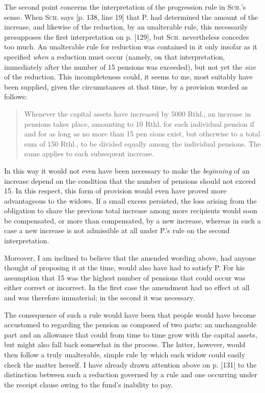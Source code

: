 The second point concerns the interpretation of the progression rule in \textsc{Sch.}'s sense. When \textsc{Sch.} says [p. 138, line 19] that P. had determined the amount of the increase, and likewise of the reduction, by an unalterable rule, this necessarily presupposes the first interpretation on p. [129], but \textsc{Sch.} nevertheless concedes too much. An unalterable rule for reduction was contained in it only insofar as it specified \textit{when} a reduction must occur (namely, on that interpretation, immediately after the number of 15 pensions was exceeded), but not yet the \textit{size} of the reduction. This incompleteness could, it seems to me, most suitably have been supplied, given the circumstances at that time, by a provision worded as follows:
\begin{quote}
Whenever the capital assets have increased by 5000 Rthl., an increase in pensions takes place, amounting to 10 Rthl. for each individual pension if and for as long as no more than 15 pen%
sions exist, but otherwise to a total sum of 150 Rthl., to be divided equally among the individual pensions. The same applies to each subsequent increase.
\end{quote}
\noindent In this way it would not even have been necessary to make the \textit{beginning} of an increase depend on the condition that the number of pensions should not exceed 15. In this respect, this form of provision would even have proved more advantageous to the widows. If a small excess persisted, the loss arising from the obligation to share the previous total increase among more recipients would soon be compensated, or more than compensated, by a new increase, whereas in such a case a new increase is not admissible at all under P.'s rule on the second interpretation.

Moreover, I am inclined to believe that the amended wording above, had anyone thought of proposing it at the time, would also have had to satisfy P. For his assumption that 15 was the highest number of pensions that could occur was either correct or incorrect. In the first case the amendment had no effect at all and was therefore immaterial; in the second it was necessary.

The consequence of such a rule would have been that people would have become accustomed to regarding the pension as composed of two parts: an unchangeable part and an allowance that could from time to time grow with the capital assets, but might also fall back somewhat in the process. The latter, however, would then follow a truly unalterable, simple rule by which each widow could easily check the matter herself. I have already drawn attention above on p. [131] to the distinction between such a reduction governed by a rule and one occurring under the receipt clause owing to the fund's inability to pay.

